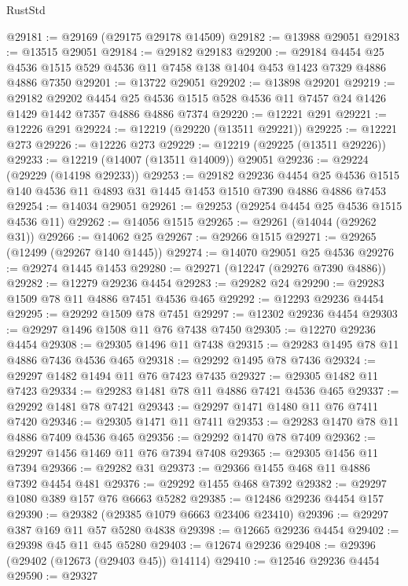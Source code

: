\begin{lexlean}{RustStd}
\begin{coremodule}
@29181 := @29169 (@29175 @29178 @14509)
@29182 := @13988 @29051
@29183 := @13515 @29051
@29184 := @29182 @29183
@29200 := @29184
    @4454
    @25
    @4536
    @1515
    @529
    @4536
    @11
    @7458
    @138
    @1404
    @453
    @1423
    @7329
    @4886
    @4886
    @7350
@29201 := @13722 @29051
@29202 := @13898 @29201
@29219 := @29182
    @29202
    @4454
    @25
    @4536
    @1515
    @528
    @4536
    @11
    @7457
    @24
    @1426
    @1429
    @1442
    @7357
    @4886
    @4886
    @7374
@29220 := @12221 @291
@29221 := @12226 @291
@29224 := @12219 (@29220 (@13511 @29221))
@29225 := @12221 @273
@29226 := @12226 @273
@29229 := @12219 (@29225 (@13511 @29226))
@29233 := @12219 (@14007 (@13511 @14009)) @29051
@29236 := @29224 (@29229 (@14198 @29233))
@29253 := @29182
    @29236
    @4454
    @25
    @4536
    @1515
    @140
    @4536
    @11
    @4893
    @31
    @1445
    @1453
    @1510
    @7390
    @4886
    @4886
    @7453
@29254 := @14034 @29051
@29261 := @29253 (@29254 @4454 @25 @4536 @1515 @4536 @11)
@29262 := @14056 @1515
@29265 := @29261 (@14044 (@29262 @31))
@29266 := @14062 @25
@29267 := @29266 @1515
@29271 := @29265 (@12499 (@29267 @140 @1445))
@29274 := @14070 @29051 @25 @4536
@29276 := @29274 @1445 @1453
@29280 := @29271 (@12247 (@29276 @7390 @4886))
@29282 := @12279 @29236 @4454
@29283 := @29282 @24
@29290 := @29283 @1509 @78 @11 @4886 @7451 @4536 @465
@29292 := @12293 @29236 @4454
@29295 := @29292 @1509 @78 @7451
@29297 := @12302 @29236 @4454
@29303 := @29297 @1496 @1508 @11 @76 @7438 @7450
@29305 := @12270 @29236 @4454
@29308 := @29305 @1496 @11 @7438
@29315 := @29283 @1495 @78 @11 @4886 @7436 @4536 @465
@29318 := @29292 @1495 @78 @7436
@29324 := @29297 @1482 @1494 @11 @76 @7423 @7435
@29327 := @29305 @1482 @11 @7423
@29334 := @29283 @1481 @78 @11 @4886 @7421 @4536 @465
@29337 := @29292 @1481 @78 @7421
@29343 := @29297 @1471 @1480 @11 @76 @7411 @7420
@29346 := @29305 @1471 @11 @7411
@29353 := @29283 @1470 @78 @11 @4886 @7409 @4536 @465
@29356 := @29292 @1470 @78 @7409
@29362 := @29297 @1456 @1469 @11 @76 @7394 @7408
@29365 := @29305 @1456 @11 @7394
@29366 := @29282 @31
@29373 := @29366 @1455 @468 @11 @4886 @7392 @4454 @481
@29376 := @29292 @1455 @468 @7392
@29382 := @29297 @1080 @389 @157 @76 @6663 @5282
@29385 := @12486 @29236 @4454 @157
@29390 := @29382 (@29385 @1079 @6663 @23406 @23410)
@29396 := @29297 @387 @169 @11 @57 @5280 @4838
@29398 := @12665 @29236 @4454
@29402 := @29398 @45 @11 @45 @5280
@29403 := @12674 @29236
@29408 := @29396 (@29402 (@12673 (@29403 @45)) @14114)
@29410 := @12546 @29236 @4454
@29590 := @29327

\end{coremodule}
\end{lexlean}
